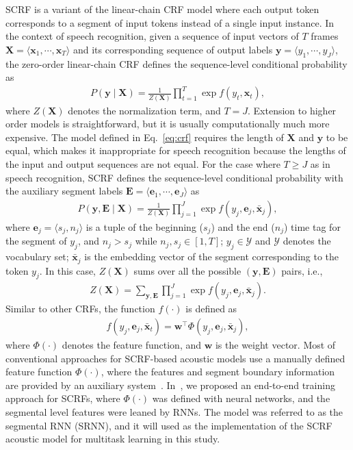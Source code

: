 \documentclass[a4paper]{article}
\begin{document}
SCRF is a variant of the linear-chain CRF model where each output token corresponds to a segment of input tokens instead of a single input instance. In the context of speech recognition, given a sequence of input vectors of $T$ frames ${\bm X} = \langle {\bm x}_1, \cdots, {\bm x}_T\rangle$ and its corresponding sequence of output labels ${\bm y} = \langle y_1, \cdots, y_J\rangle$, the zero-order linear-chain CRF defines the sequence-level conditional probability as
\begin{align}
\label{eq:crf}
P({\bm y} \mid {\bm X}) = \frac{1}{Z({\bm X})} \prod_{t=1}^T \exp f \left( y_t, {\bm x}_t \right),
\end{align}
where $Z({\bm X})$ denotes the normalization term, and $T=J$. Extension to higher order models is straightforward, but it is usually computationally much more expensive. The model defined in Eq.~\eqref{eq:crf} requires the length of ${\bm X}$ and ${\bm y}$ to be equal, which makes it inappropriate for speech recognition because the lengths of the input and output sequences are not equal. For the case where  $T\ge J$ as in speech recognition, SCRF defines the sequence-level conditional probability with the auxiliary segment labels ${\bm E} = \langle {\bm e}_1, \cdots, {\bm e}_J\rangle $ as
\begin{align}
\label{eq:scrf}
P({\bm y}, {\bm E} \mid {\bm X}) = \frac{1}{Z({\bm X})} \prod_{j=1}^J \exp f \left( y_j, {\bm e}_j, \bar{\bm x}_j \right),
\end{align}
where $\mathbf{e}_j = \langle s_{j}, n_{j} \rangle$ is a tuple of the beginning ($s_{j}$) and the end ($n_{j}$) time tag for the segment of $y_j$, and $n_j > s_j $ while $n_j, s_j \in [1, T]$; $y_j \in \mathcal{Y}$ and $\mathcal{Y}$ denotes the vocabulary set; $\bar{\bm x}_j$ is the embedding vector of the segment corresponding to the token $y_j$.  In this case, $Z({\bm X})$ sums over all the possible $({\bm y, \bm E})$ pairs, i.e.,
\begin{eqnarray}
Z({\bm X}) = \sum_{\bm y,\bm E} \prod_{j=1}^J \exp f \left( y_j, {\bm e}_j, \bar{\bm x}_j \right).
\end{eqnarray}
Similar to other CRFs, the function $f(\cdot)$ is defined as
\begin{eqnarray}
\label{eq:phi}
f \left( y_j, {\bm e}_j, \bar{\bm x}_t \right) = \mathbf{w}^\top \Phi (y_j, {\bm e}_j, \bar{\bm x}_j),
\end{eqnarray}
where $\Phi(\cdot)$ denotes the feature function, and $\mathbf{w}$ is the weight vector. Most of conventional approaches for SCRF-based acoustic models use a manually defined feature function $\Phi(\cdot)$, where the features and segment boundary information are provided by an auxiliary system~\cite{zweig2011speech, fosler2013conditional}. In~\cite{kong2015segmental, lu2016segmental}, we proposed an end-to-end training approach for SCRFs, where $\Phi(\cdot)$ was defined with neural networks, and the segmental level features were leaned by RNNs. The model was referred to as the segmental RNN (SRNN), and it will used as the implementation of the SCRF acoustic model for multitask learning in this study. 
\end{document}

